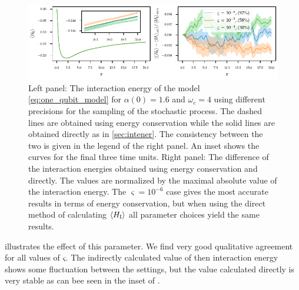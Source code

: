 \begin{figure}[h]
  \centering
  \includegraphics{figs/one_bath_syst/stocproc_systematics_interaction}
  \caption{\label{fig:stocproc_systematics} Left panel: The
    interaction energy of the model \cref{eq:one_qubit_model} for
    \(α(0)=1.6\) and \(ω_c=4\) using different precisions for the
    sampling of the stochastic process. The dashed lines are obtained
    using energy conservation while the solid lines are obtained
    directly as in \cref{sec:intener}. The consistency between the two
    is given in the legend of the right panel. An inset shows the
    curves for the final three time units. Right panel: The difference
    of the interaction energies obtained using energy conservation and
    directly. The values are normalized by the maximal absolute value
    of the interaction energy. The \(\varsigma = 10^{-6}\) case gives
    the most accurate results in terms of energy conservation, but
    when using the direct method of calculating \(\ev{H_{\inter}}\)
    all parameter choices yield the same results.}
\end{figure}
 illustrates the effect of this
parameter. We find very good qualitative agreement for all values of
\(ς\). The indirectly calculated value of then interaction energy
shows some fluctuation between the settings, but the value calculated
directly is very stable as can bee seen in the inset of
.

